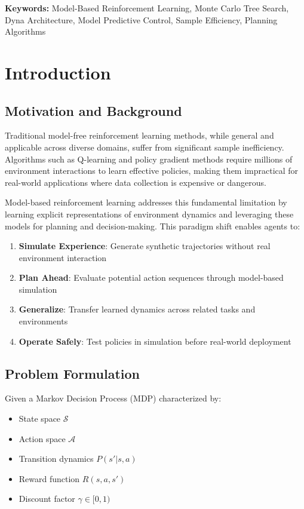 \documentclass[12pt]{article}
\numberwithin{equation}{section}
\numberwithin{figure}{section}
\numberwithin{table}{section}
\numberwithin{algorithm}{section}
\begin{document}
{{{\textbf{Keywords:} Model-Based Reinforcement Learning, Monte Carlo Tree Search, Dyna Architecture, Model Predictive Control, Sample Efficiency, Planning Algorithms

\section{Introduction}

\subsection{Motivation and Background}
Traditional model-free reinforcement learning methods, while general and applicable across diverse domains, suffer from significant sample inefficiency. Algorithms such as Q-learning and policy gradient methods require millions of environment interactions to learn effective policies, making them impractical for real-world applications where data collection is expensive or dangerous.

Model-based reinforcement learning addresses this fundamental limitation by learning explicit representations of environment dynamics and leveraging these models for planning and decision-making. This paradigm shift enables agents to:

\begin{enumerate}
    \item \textbf{Simulate Experience}: Generate synthetic trajectories without real environment interaction
    \item \textbf{Plan Ahead}: Evaluate potential action sequences through model-based simulation
    \item \textbf{Generalize}: Transfer learned dynamics across related tasks and environments
    \item \textbf{Operate Safely}: Test policies in simulation before real-world deployment
\end{enumerate}

\subsection{Problem Formulation}
Given a Markov Decision Process (MDP) characterized by:
\begin{itemize}
    \item State space $\mathcal{S}$
    \item Action space $\mathcal{A}$
    \item Transition dynamics $P(s'|s,a)$
    \item Reward function $R(s,a,s')$
    \item Discount factor $\gamma \in [0,1)$
\end{itemize}

}}}
\end{document}
